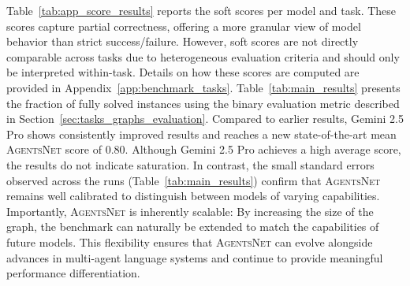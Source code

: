 \documentclass{article}
\newcommand{\benchmark}{\textsc{AgentsNet}}
\begin{document}
Table~\ref{tab:app_score_results} reports the soft scores per model and task. These scores capture partial correctness, offering a more granular view of model behavior than strict success/failure. However, soft scores are not directly comparable across tasks due to heterogeneous evaluation criteria and should only be interpreted within-task. Details on how these scores are computed are provided in Appendix~\ref{app:benchmark_tasks}.
Table~\ref{tab:main_results} presents the fraction of fully solved instances using the binary evaluation metric described in Section~\ref{sec:tasks_graphs_evaluation}. Compared to earlier results, Gemini 2.5 Pro shows consistently improved results and reaches a new state-of-the-art mean \benchmark{} score of 0.80. Although Gemini 2.5 Pro achieves a high average score, the results do not indicate saturation. In contrast, the small standard errors observed across the runs (Table~\ref{tab:main_results}) confirm that \benchmark{} remains well calibrated to distinguish between models of varying capabilities. Importantly, \benchmark{} is inherently scalable: By increasing the size of the graph, the benchmark can naturally be extended to match the capabilities of future models. This flexibility ensures that \benchmark{} can evolve alongside advances in multi-agent language systems and continue to provide meaningful performance differentiation.
\end{document}
